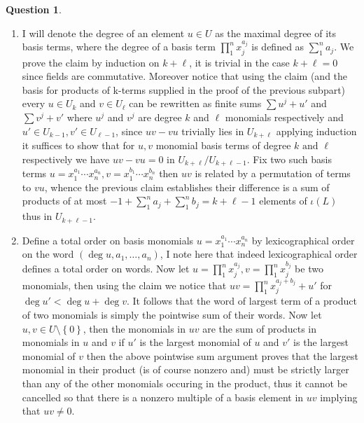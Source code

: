 \documentclass[10.5pt]{article}
\theoremstyle{definition}
\newtheorem{pb}{Question}
\numberwithin{example}{subsection}
\numberwithin{proposition}{subsection}
\newcommand{\set}[1]{\left\{#1\right\}}
\newcommand{\tand}{\text{ and }}
\begin{document}
\begin{pb}
\begin{enumerate}
            \item I will denote the degree of an element \(u \in U\) as the maximal degree of its basis terms, where the degree of a basis term \(\prod_1^n x_j^{a_j}\) is defined as \(\sum_1^n a_j\). We prove the claim by induction on \(k + \ell\), it is trivial in the case \(k + \ell = 0\) since fields are commutative. Moreover notice that using the claim (and the basis for products of k-terms supplied in the proof of the previous subpart) every \(u \in U_k\) and \(v \in U_\ell\) can be rewritten as finite sums \(\sum u^j + u'\) and \(\sum v^j + v'\) where \(u^j\) and \(v^j\) are degree \(k\) and \(\ell\) monomials respectively and \(u' \in U_{k-1}, v' \in U_{\ell - 1}\), since \(uv - vu\) trivially lies in \(U_{k+\ell}\) applying induction it suffices to show that for \(u,v\) monomial basis terms of degree \(k \tand \ell\) respectively we have \(uv - vu = 0\) in \(U_{k+\ell}/U_{k+\ell - 1}\). Fix two such basis terms \(u = x_1^{a_1}\cdots x_n^{a_n}, v = x_1^{b_1}\cdots x_n^{b_n}\) then \(uv\) is related by a permutation of terms to \(vu\), whence the previous claim establishes their difference is a sum of products of at most \(-1 + \sum_1^n a_j + \sum_1^n b_j = k + \ell - 1\) elements of \(\iota(L)\) thus in \(U_{k + \ell -1}\).
            
            \item Define a total order on basis monomials \(u = x_1^{a_1}\cdots x_n^{a_n}\) by lexicographical order on the word \((\deg u,a_1,\hdots,a_n)\), I note here that indeed lexicographical order defines a total order on words. Now let \(u = \prod_1^n x_j^{a_j},v = \prod_1^n x_j^{b_j}\) be two monomials, then using the claim we notice that \(uv = \prod_1^n x_j^{a_j + b_j} + u'\) for \(\deg u' < \deg u + \deg v\). It follows that the word of largest term of a product of two monomials is simply the pointwise sum of their words. Now let \(u,v \in U \setminus \set{0}\), then the monomials in \(uv\) are the sum of products in monomials in \(u\) and \(v\) if \(u'\) is the largest monomial of \(u\) and \(v'\) is the largest monomial of \(v\) then the above pointwise sum argument proves that the largest monomial in their product (is of course nonzero and) must be strictly larger than any of the other monomials occuring in the product, thus it cannot be cancelled so that there is a nonzero multiple of a basis element in \(uv\) implying that \(uv \neq 0\).
        \end{enumerate}


\end{pb}
\end{document}
